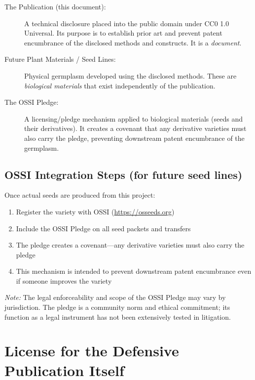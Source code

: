 \documentclass[12pt,a4paper]{article}
\begin{document}
\begin{description}
  \item[The Publication (this document):] A technical disclosure placed into the public domain under CC0 1.0 Universal. Its purpose is to establish prior art and prevent patent encumbrance of the disclosed methods and constructs. It is a \textit{document}.
  \item[Future Plant Materials / Seed Lines:] Physical germplasm developed using the disclosed methods. These are \textit{biological materials} that exist independently of the publication.
  \item[The OSSI Pledge:] A licensing/pledge mechanism applied to biological materials (seeds and their derivatives). It creates a covenant that any derivative varieties must also carry the pledge, preventing downstream patent encumbrance of the germplasm.
\end{description}

\subsection{OSSI Integration Steps (for future seed lines)}

Once actual seeds are produced from this project:
\begin{enumerate}
  \item Register the variety with OSSI (\url{https://osseeds.org})
  \item Include the OSSI Pledge on all seed packets and transfers
  \item The pledge creates a covenant---any derivative varieties must also carry the pledge
  \item This mechanism is intended to prevent downstream patent encumbrance even if someone improves the variety
\end{enumerate}

\noindent\textit{Note:} The legal enforceability and scope of the OSSI Pledge may vary by jurisdiction. The pledge is a community norm and ethical commitment; its function as a legal instrument has not been extensively tested in litigation.

\section{License for the Defensive Publication Itself}
\end{document}
